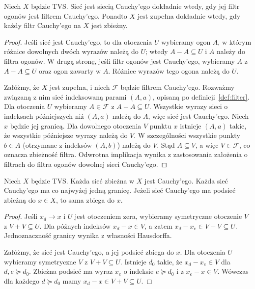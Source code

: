 \begin{twierdzenie}
\label{thm:filter-cauchy}
Niech $X$ będzie TVS. Sieć jest siecią Cauchy'ego dokładnie wtedy,
gdy jej filtr ogonów jest filtrem Cauchy'ego. Ponadto $X$ jest
zupełna dokładnie wtedy, gdy każdy filtr Cauchy'ego na $X$
jest zbieżny.
\end{twierdzenie}
\begin{proof}
Jeśli sieć jest Cauchy'ego, to dla otoczenia $U$ wybieramy
ogon $A$, w którym różnice dowolnych dwóch wyrazów należą do $U$;
wtedy $A-A\subseteq U$ i $A$ należy do filtra ogonów.
W drugą stronę, jeśli filtr ogonów jest Cauchy'ego, wybieramy
$A$ z $A-A\subseteq U$ oraz ogon zawarty w $A$. Różnice
wyrazów tego ogona należą do $U$.

Załóżmy, że $X$ jest zupełna, i niech $\mathcal F$ będzie filtrem
Cauchy'ego. Rozważmy związaną z nim sieć indeksowaną parami
$(A,a)$, opisaną po definicji~\ref{def:filter}. Dla otoczenia
$U$ wybieramy $A\in\mathcal F$ z $A-A\subseteq U$.
Wszystkie wyrazy sieci o indeksach późniejszych niż $(A,a)$
należą do $A$, więc sieć jest Cauchy'ego. Niech $x$ będzie jej
granicą. Dla dowolnego otoczenia $V$ punktu $x$ istnieje
$(A,a)$ takie, że wszystkie późniejsze wyrazy należą do $V$.
W szczególności wszystkie punkty $b\in A$ (otrzymane
z indeksów $(A,b)$) należą do $V$. Stąd $A\subseteq V$,
a więc $V\in\mathcal F$, co oznacza zbieżność filtra.
Odwrotna implikacja wynika z zastosowania założenia o filtrach
do filtra ogonów dowolnej sieci Cauchy'ego.
\end{proof}

\begin{stwierdzenie}
\label{prop:complete-basic}
Niech $X$ będzie TVS. Każda sieć zbieżna w $X$ jest Cauchy'ego.
Każda sieć Cauchy'ego ma co najwyżej jedną granicę.
Jeżeli sieć Cauchy'ego ma podsieć zbieżną do $x\in X$, to sama
zbiega do $x$.
\end{stwierdzenie}
\begin{proof}
Jeśli $x_d\to x$ i $U$ jest otoczeniem zera, wybieramy
symetryczne otoczenie $V$ z $V+V\subseteq U$.
Dla późnych indeksów $x_d-x\in V$, a zatem
$x_d-x_e\in V-V\subseteq U$. Jednoznaczność granicy
wynika z własności Hausdorffa.

Załóżmy, że sieć jest Cauchy'ego, a jej podsieć zbiega do $x$.
Dla otoczenia $U$ wybieramy symetryczne $V$ z $V+V\subseteq U$.
Istnieje $d_0$ takie, że $x_d-x_e\in V$ dla $d,e\succeq d_0$.
Zbieżna podsieć ma wyraz $x_{e}$ o indeksie $e\succeq d_0$
i z $x_e-x\in V$. Wówczas dla każdego $d\succeq d_0$
mamy $x_d-x\in V+V\subseteq U$.
\end{proof}

